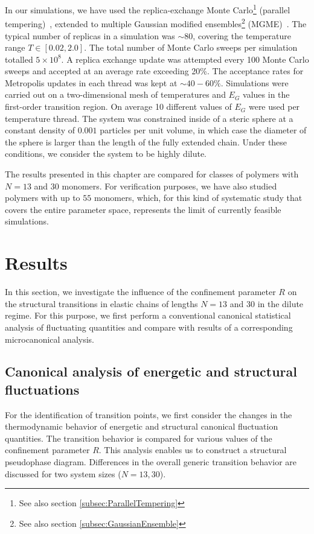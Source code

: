 \documentclass[12pt]{report}
\begin{document}
In our simulations, we have used the replica-exchange Monte Carlo\footnote{See also section\,\,\ref{subsec:ParallelTempering}} (parallel tempering)~\cite{sw1,geyer1,huku1,huku2}, extended to multiple Gaussian modified ensembles\footnote{See also section\,\,\ref{subsec:GaussianEnsemble}} (MGME)~\cite{Neuhaus2006}. The typical number of replicas in a simulation was $\sim80$, covering the temperature range $T\in [0.02,2.0]$. The total number of Monte Carlo sweeps per simulation totalled $5\times 10^8$. A replica exchange update was attempted every 100 Monte Carlo sweeps and accepted at an average rate exceeding 20\%. The acceptance rates for Metropolis updates in each thread was kept at $\sim 40-60\%$. Simulations were carried out on a two-dimensional mesh of temperatures and $E_G$ values in the first-order transition region. On average 10 different values of $E_G$ were used per temperature thread. The system was constrained inside of a steric sphere at a constant density of $0.001$ particles per unit volume, in which case the diameter of the sphere is larger than the length of the fully extended chain. Under these conditions, we consider the system to be highly dilute. 

The results presented in this chapter are compared for classes of polymers with $N=13$ and $30$ monomers. For verification purposes, we have also studied polymers with up to $55$ monomers, which, for this kind of systematic study that covers the entire parameter space, represents the limit of currently feasible simulations. 


\section{Results}
%
In this section, we investigate the influence of the confinement parameter $R$ on the structural transitions in elastic chains of lengths $N = 13$ and $30$ in the dilute regime. For this purpose, we first perform a conventional canonical statistical analysis of fluctuating quantities and compare with results of a corresponding microcanonical analysis.
%
\subsection{Canonical analysis of energetic and structural fluctuations}
% 
For the identification of transition points, we first consider the changes in the thermodynamic behavior of energetic and structural canonical fluctuation quantities. The transition behavior is compared for various values of the confinement parameter $R$. This analysis enables us to construct a structural pseudophase diagram. Differences in the overall generic transition behavior are discussed for two system sizes ($N=13,30$). 
\end{document}
